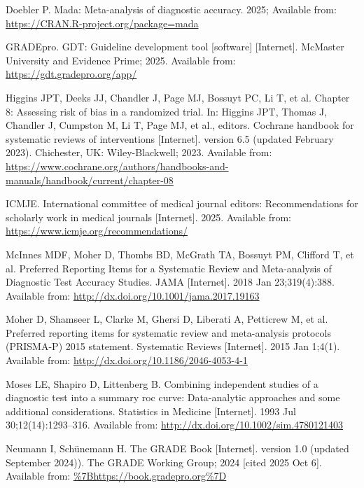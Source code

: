 \documentclass[
  11pt,
  a4paper,
  DIV=11,
  numbers=noendperiod]{scrreprt}
\newlength{\cslhangindent}
\newenvironment{CSLReferences}[2] %
 {\begin{list}{}{%
  \setlength{\itemindent}{0pt}
  \setlength{\leftmargin}{0pt}
  \setlength{\parsep}{0pt}
  \ifodd #1
   \setlength{\leftmargin}{\cslhangindent}
   \setlength{\itemindent}{-1\cslhangindent}
  \fi
  \setlength{\itemsep}{#2\baselineskip}}}
 {\end{list}}
\begin{document}
\label{refs}
\begin{CSLReferences}{1}{1}
Doebler P. Mada: Meta-analysis of diagnostic accuracy. 2025; Available
from: \url{https://CRAN.R-project.org/package=mada}

GRADEpro. GDT: Guideline development tool {[}software{]} {[}Internet{]}.
{McMaster University and Evidence Prime}; 2025. Available from:
\url{https://gdt.gradepro.org/app/}

Higgins JPT, Deeks JJ, Chandler J, Page MJ, Bossuyt PC, Li T, et al.
Chapter 8: Assessing risk of bias in a randomized trial. In: Higgins
JPT, Thomas J, Chandler J, Cumpston M, Li T, Page MJ, et al., editors.
Cochrane handbook for systematic reviews of interventions
{[}Internet{]}. version 6.5 (updated February 2023). Chichester, UK:
Wiley-Blackwell; 2023. Available from:
\url{https://www.cochrane.org/authors/handbooks-and-manuals/handbook/current/chapter-08}

ICMJE. International committee of medical journal editors:
Recommendations for scholarly work in medical journals {[}Internet{]}.
2025. Available from: \url{https://www.icmje.org/recommendations/}

McInnes MDF, Moher D, Thombs BD, McGrath TA, Bossuyt PM, Clifford T, et
al. Preferred Reporting Items for a Systematic Review and Meta-analysis
of Diagnostic Test Accuracy Studies. JAMA {[}Internet{]}. 2018 Jan
23;319(4):388. Available from:
\url{http://dx.doi.org/10.1001/jama.2017.19163}

Moher D, Shamseer L, Clarke M, Ghersi D, Liberati A, Petticrew M, et al.
Preferred reporting items for systematic review and meta-analysis
protocols (PRISMA-P) 2015 statement. Systematic Reviews {[}Internet{]}.
2015 Jan 1;4(1). Available from:
\url{http://dx.doi.org/10.1186/2046-4053-4-1}

Moses LE, Shapiro D, Littenberg B. Combining independent studies of a
diagnostic test into a summary roc curve: Data{-}analytic approaches and
some additional considerations. Statistics in Medicine {[}Internet{]}.
1993 Jul 30;12(14):1293--316. Available from:
\url{http://dx.doi.org/10.1002/sim.4780121403}

Neumann I, Schünemann H. {The GRADE Book} {[}Internet{]}. version 1.0
(updated September 2024)). The GRADE Working Group; 2024 {[}cited 2025
Oct 6{]}. Available from: \url{\%7Bhttps://book.gradepro.org\%7D}


\end{CSLReferences}
\end{document}

